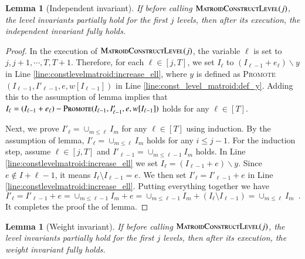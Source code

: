 \documentclass[11pt]{article}
\newtheorem{lemma}[theorem]{Lemma}
\newcommand{\MatroidConstLevel}{\textsc{MatroidConstructLevel}}
\newcommand{\replacementTester}{\textsc{Promote}}
\begin{document}
\begin{lemma}[Independent invariant]
\label{lm:independent:leveling}
If before calling $\MatroidConstLevel{}(j)$, the level invariants partially hold for the first $j$ levels,
then after its execution, the independent invariant fully holds. 
\end{lemma}

\begin{proof} 

In the execution of $\MatroidConstLevel{}(j)$, the variable $\ell$ is set to $j, j+1,\cdots, T,T+1$. Therefore, for each $\ell \in  [j,T]$, we set $I_{\ell}$ to  $(I_{\ell-1} + e_\ell) \backslash y$ in Line \ref{line:constlevelmatroid:increase_ell}, where $y$ is defined as \replacementTester$(I_{\ell-1}, I'_{\ell-1}, e, w[I_{\ell - 1}])$ in Line \ref{line:const_level_matroid:def_y}.
Adding this to the assumption of lemma implies that $I_{\ell} = (I_{\ell-1} + e_\ell) - \replacementTester(I_{\ell-1}, I'_{\ell-1}, e, w[I_{\ell - 1}])$ holds for any $\ell \in [T]$.

Next, we prove $I'_\ell = \cup_{m \le \ell} I_m$ for any $\ell\in[T]$ using induction.  
By the assumption of lemma, $I'_{\ell} = \cup_{m \le {\ell}} I_{m}$ holds for any  $i\leq j-1$.
For the induction step, assume $\ell  \in [j,T]$ and 
$I'_{\ell-1} = \cup_{m \le {\ell-1}} I_{m}$ holds. 
In Line \ref{line:constlevelmatroid:increase_ell} we set $I_{\ell}=(I_{\ell-1} + e) \backslash y$.
Since $e\notin I+{\ell-1}$, it means $I_{\ell} \setminus I_{\ell-1}=e$.
We then set $I'_{\ell}=I'_{\ell-1} + e$ in Line \ref{line:constlevelmatroid:increase_ell}. Putting everything together we have
$$I'_{\ell} = I'_{\ell-1} + e=\cup_{m \le {\ell-1}} I_{m}+e = \cup_{m \le {\ell-1}} I_{m} + (I_{\ell} \setminus I_{\ell-1}) = \cup_{m \le {\ell}} I_{m} \enspace .$$
It completes the proof the of lemma.
\end{proof}



\begin{lemma}[Weight invariant]
\label{lm:weight:leveling}
If before calling $\MatroidConstLevel{}(j)$, the level invariants partially hold for the first $j$ levels,
then after its execution, the weight invariant fully holds. 
\end{lemma}
\end{document}
